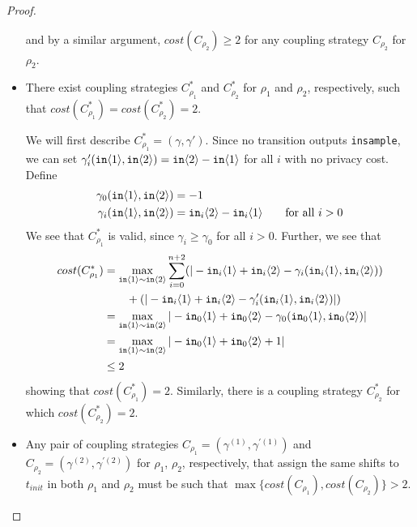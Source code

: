 \begin{proof}
\begin{itemize}
    and by a similar argument, $cost(C_{\rho_2})\geq 2$ for any coupling strategy $C_{\rho_2}$ for $\rho_2$. 

    \item There exist coupling strategies $C_{\rho_1}^*$ and $C_{\rho_2}^*$ for $\rho_1$ and $\rho_2$, respectively, such that $cost(C_{\rho_1}^*) = cost(C_{\rho_2}^*) = 2$. 
    
    We will first describe $C_{\rho_1}^* = (\gamma, \gamma')$. Since no transition outputs \texttt{insample}, we can set $\gamma_i'(\texttt{in}\langle1 \rangle, \texttt{in}\langle2 \rangle) = \texttt{in}\langle2 \rangle - \texttt{in}\langle1 \rangle$ for all $i$ with no privacy cost. Define 
    \begin{align*}
        \gamma_0(\texttt{in}\langle1 \rangle, \texttt{in}\langle2 \rangle) &= -1 \\
        \gamma_i(\texttt{in}\langle1 \rangle, \texttt{in}\langle2 \rangle) &= \texttt{in}_i\langle2 \rangle - \texttt{in}_i\langle1 \rangle \qquad \text{for all $i>0$}
    \end{align*}
    We see that $C^*_{\rho_1}$ is valid, since $\gamma_i\geq \gamma_{0}$ for all $i>0$. Further, we see that 
    \begin{align*}
        cost(C^*_{\rho_1}) &= \max_{\texttt{in}\langle1 \rangle\sim\texttt{in}\langle2 \rangle}\sum_{i=0}^{n+2}(|-\texttt{in}_i\langle1 \rangle+\texttt{in}_i\langle2 \rangle-\gamma_i(\texttt{in}_i\langle1 \rangle, \texttt{in}_i\langle2 \rangle))\\&\qquad+(|-\texttt{in}_i\langle1 \rangle+\texttt{in}_i\langle2 \rangle-\gamma_i'(\texttt{in}_i\langle1 \rangle, \texttt{in}_i\langle2 \rangle)|)\\
        &= \max_{\texttt{in}\langle1 \rangle\sim\texttt{in}\langle2 \rangle} |-\texttt{in}_0\langle1 \rangle+\texttt{in}_0\langle2 \rangle-\gamma_0(\texttt{in}_0\langle1 \rangle, \texttt{in}_0\langle2 \rangle)| \\
        &= \max_{\texttt{in}\langle1 \rangle\sim\texttt{in}\langle2 \rangle} |-\texttt{in}_0\langle1 \rangle+\texttt{in}_0\langle2 \rangle+1|\\
        &\leq 2 
    \end{align*}
    showing that $cost(C^*_{\rho_1}) = 2$. Similarly, there is a coupling strategy $C^*_{\rho_2}$ for which $cost(C^*_{\rho_2}) = 2$.
    
    \item Any pair of coupling strategies $C_{\rho_1} = (\gamma^{(1)}, \gamma^{\prime(1)})$ and $C_{\rho_2}=(\gamma^{(2)}, \gamma^{\prime(2)})$ for $\rho_1$, $\rho_2$, respectively, that assign the same shifts to $t_{init}$ in both $\rho_1$ and $\rho_2$ must be such that $\max\{cost(C_{\rho_1}), cost(C_{\rho_2})\}>2$.
    

\end{itemize}
\end{proof}
